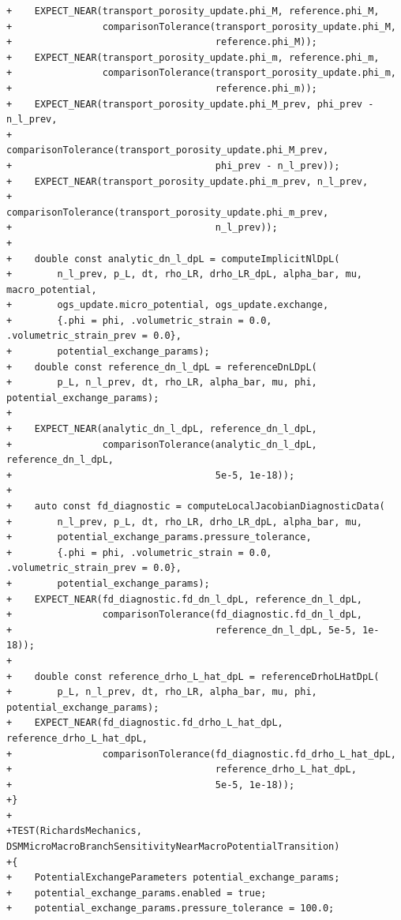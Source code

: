\documentclass[10pt]{article}
\begin{document}
\begin{lstlisting}
+    EXPECT_NEAR(transport_porosity_update.phi_M, reference.phi_M,
+                comparisonTolerance(transport_porosity_update.phi_M,
+                                    reference.phi_M));
+    EXPECT_NEAR(transport_porosity_update.phi_m, reference.phi_m,
+                comparisonTolerance(transport_porosity_update.phi_m,
+                                    reference.phi_m));
+    EXPECT_NEAR(transport_porosity_update.phi_M_prev, phi_prev - n_l_prev,
+                comparisonTolerance(transport_porosity_update.phi_M_prev,
+                                    phi_prev - n_l_prev));
+    EXPECT_NEAR(transport_porosity_update.phi_m_prev, n_l_prev,
+                comparisonTolerance(transport_porosity_update.phi_m_prev,
+                                    n_l_prev));
+
+    double const analytic_dn_l_dpL = computeImplicitNlDpL(
+        n_l_prev, p_L, dt, rho_LR, drho_LR_dpL, alpha_bar, mu, macro_potential,
+        ogs_update.micro_potential, ogs_update.exchange,
+        {.phi = phi, .volumetric_strain = 0.0, .volumetric_strain_prev = 0.0},
+        potential_exchange_params);
+    double const reference_dn_l_dpL = referenceDnLDpL(
+        p_L, n_l_prev, dt, rho_LR, alpha_bar, mu, phi, potential_exchange_params);
+
+    EXPECT_NEAR(analytic_dn_l_dpL, reference_dn_l_dpL,
+                comparisonTolerance(analytic_dn_l_dpL, reference_dn_l_dpL,
+                                    5e-5, 1e-18));
+
+    auto const fd_diagnostic = computeLocalJacobianDiagnosticData(
+        n_l_prev, p_L, dt, rho_LR, drho_LR_dpL, alpha_bar, mu,
+        potential_exchange_params.pressure_tolerance,
+        {.phi = phi, .volumetric_strain = 0.0, .volumetric_strain_prev = 0.0},
+        potential_exchange_params);
+    EXPECT_NEAR(fd_diagnostic.fd_dn_l_dpL, reference_dn_l_dpL,
+                comparisonTolerance(fd_diagnostic.fd_dn_l_dpL,
+                                    reference_dn_l_dpL, 5e-5, 1e-18));
+
+    double const reference_drho_L_hat_dpL = referenceDrhoLHatDpL(
+        p_L, n_l_prev, dt, rho_LR, alpha_bar, mu, phi, potential_exchange_params);
+    EXPECT_NEAR(fd_diagnostic.fd_drho_L_hat_dpL, reference_drho_L_hat_dpL,
+                comparisonTolerance(fd_diagnostic.fd_drho_L_hat_dpL,
+                                    reference_drho_L_hat_dpL,
+                                    5e-5, 1e-18));
+}
+
+TEST(RichardsMechanics, DSMMicroMacroBranchSensitivityNearMacroPotentialTransition)
+{
+    PotentialExchangeParameters potential_exchange_params;
+    potential_exchange_params.enabled = true;
+    potential_exchange_params.pressure_tolerance = 100.0;

\end{lstlisting}
\end{document}
